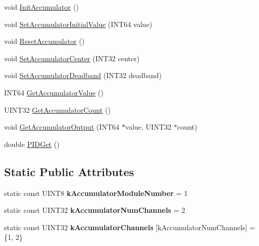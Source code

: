 \begin{DoxyCompactItemize}
\item 
void \hyperlink{classAnalogChannel_a8f3c0b9bd0ca7ab9449b89e5c2abd53f}{InitAccumulator} ()
\item 
void \hyperlink{classAnalogChannel_aae43ed632a10270fd163d44eea2d8f8f}{SetAccumulatorInitialValue} (INT64 value)
\item 
void \hyperlink{classAnalogChannel_aecf5da778576f4904e51ece5d327ea17}{ResetAccumulator} ()
\item 
void \hyperlink{classAnalogChannel_a1e28d604275cfda65b8a5e1b5bd79134}{SetAccumulatorCenter} (INT32 center)
\item 
void \hyperlink{classAnalogChannel_ac404eb71545eb04daf9d09c465e0997a}{SetAccumulatorDeadband} (INT32 deadband)
\item 
INT64 \hyperlink{classAnalogChannel_a8ad12eb79e2ae1c981654ec4907b0f03}{GetAccumulatorValue} ()
\item 
UINT32 \hyperlink{classAnalogChannel_a234fa038c75f10ddfc20147740d61dda}{GetAccumulatorCount} ()
\item 
void \hyperlink{classAnalogChannel_ae133b8fe46584ea20b35ea3a0294c2bb}{GetAccumulatorOutput} (INT64 $\ast$value, UINT32 $\ast$count)
\item 
double \hyperlink{classAnalogChannel_ac6317cfcc26ddff2289f8efc242d99d3}{PIDGet} ()
\end{DoxyCompactItemize}
\subsection*{Static Public Attributes}
\begin{DoxyCompactItemize}
\item 
\hypertarget{classAnalogChannel_ac1f9aaaf38df6f26768539ddb493b59e}{
static const UINT8 {\bfseries kAccumulatorModuleNumber} = 1}
\label{classAnalogChannel_ac1f9aaaf38df6f26768539ddb493b59e}

\item 
\hypertarget{classAnalogChannel_aa1ecbaa46e972b4d404ce260d58c5c34}{
static const UINT32 {\bfseries kAccumulatorNumChannels} = 2}
\label{classAnalogChannel_aa1ecbaa46e972b4d404ce260d58c5c34}

\item 
\hypertarget{classAnalogChannel_ae83f8b390f6f72a1eb743352e688b7f8}{
static const UINT32 {\bfseries kAccumulatorChannels} \mbox{[}kAccumulatorNumChannels\mbox{]} = \{1, 2\}}
\label{classAnalogChannel_ae83f8b390f6f72a1eb743352e688b7f8}

\end{DoxyCompactItemize}


